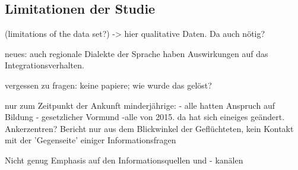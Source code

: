 \subsection{Limitationen der Studie}

(limitations of the data set?) -> hier qualitative Daten. Da auch nötig?

neues: auch regionale Dialekte der Sprache haben Auswirkungen auf das Integrationsverhalten.

vergessen zu fragen: keine papiere; wie wurde das gelöst?

nur zum Zeitpunkt der Ankunft minderjährige:
    - alle hatten Anspruch auf Bildung
    - gesetzlicher Vormund
    -alle von 2015. da hat sich eineiges geändert. Ankerzentren?
Bericht nur aus dem Blickwinkel der Geflüchteten, kein Kontakt mit der 'Gegenseite' einiger Informationsfragen

    Nicht genug Emphasis auf den Informationsquellen und - kanälen